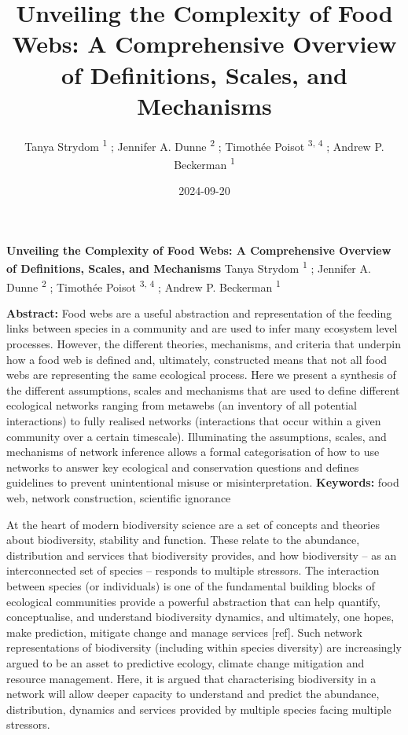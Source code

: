 \documentclass[
]{article}
\title{Unveiling the Complexity of Food Webs: A Comprehensive Overview
of Definitions, Scales, and Mechanisms}
\author{Tanya Strydom %
%
\textsuperscript{%
%
1%
}%
; Jennifer A. Dunne %
%
\textsuperscript{%
%
2%
}%
; Timothée Poisot %
%
\textsuperscript{%
3,%
4%
}%
; Andrew P. Beckerman %
%
\textsuperscript{%
%
1%
}%
}
\date{2024-09-20}
\begin{document}
\thispagestyle{empty}
{\bfseries\sffamily\Large Unveiling the Complexity of Food Webs: A
Comprehensive Overview of Definitions, Scales, and Mechanisms}
\vfil
Tanya Strydom %
%
\textsuperscript{%
%
1%
}%
; Jennifer A. Dunne %
%
\textsuperscript{%
%
2%
}%
; Timothée Poisot %
%
\textsuperscript{%
3,%
4%
}%
; Andrew P. Beckerman %
%
\textsuperscript{%
%
1%
}%

\vfil
{\small
\textbf{Abstract:} Food webs are a useful abstraction and representation
of the feeding links between species in a community and are used to
infer many ecosystem level processes. However, the different theories,
mechanisms, and criteria that underpin how a food web is defined and,
ultimately, constructed means that not all food webs are representing
the same ecological process. Here we present a synthesis of the
different assumptions, scales and mechanisms that are used to define
different ecological networks ranging from metawebs (an inventory of all
potential interactions) to fully realised networks (interactions that
occur within a given community over a certain timescale). Illuminating
the assumptions, scales, and mechanisms of network inference allows a
formal categorisation of how to use networks to answer key ecological
and conservation questions and defines guidelines to prevent
unintentional misuse or misinterpretation.
\vfil
\textbf{Keywords:} %
food web, network construction, %
scientific ignorance%
}
\clearpage
\setcounter{page}{1}
\doublespacing
\linenumbers


At the heart of modern biodiversity science are a set of concepts and
theories about biodiversity, stability and function. These relate to the
abundance, distribution and services that biodiversity provides, and how
biodiversity -- as an interconnected set of species -- responds to
multiple stressors. The interaction between species (or individuals) is
one of the fundamental building blocks of ecological communities provide
a powerful abstraction that can help quantify, conceptualise, and
understand biodiversity dynamics, and ultimately, one hopes, make
prediction, mitigate change and manage services {[}ref{]}. Such network
representations of biodiversity (including within species diversity) are
increasingly argued to be an asset to predictive ecology, climate change
mitigation and resource management. Here, it is argued that
characterising biodiversity in a network will allow deeper capacity to
understand and predict the abundance, distribution, dynamics and
services provided by multiple species facing multiple stressors.
\end{document}
